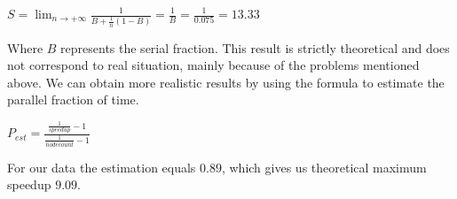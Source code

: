 \begin{center}
$S=\lim_{n \to +\infty} \frac{1}{B + \frac{1}{n}(1 - B)} = \frac{1}{B} = \frac{1}{0.075} = 13.33$
\end{center}

Where $B$ represents the serial fraction. This result is strictly
theoretical and does not correspond to real situation, mainly because of
the problems mentioned above. We can obtain more realistic results by
using the formula to estimate the parallel fraction of time.

\begin{center}
$P_{est} = \frac{\frac{1}{speedup}-1}{\frac{1}{node count} - 1}$
\end{center}

For our data the estimation equals $0.89$, which gives us theoretical
maximum speedup $9.09$.
